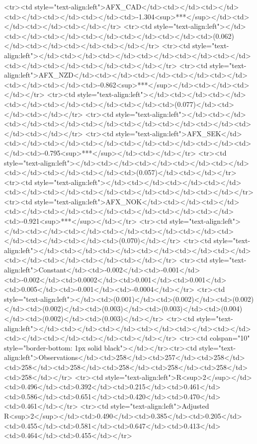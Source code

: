 <tr><td style="text-align:left">AFX_CAD</td><td></td><td></td><td></td><td></td><td></td><td>-1.304<sup>***</sup></td><td></td><td></td><td></td></tr>
<tr><td style="text-align:left"></td><td></td><td></td><td></td><td></td><td></td><td>(0.062)</td><td></td><td></td><td></td></tr>
<tr><td style="text-align:left"></td><td></td><td></td><td></td><td></td><td></td><td></td><td></td><td></td><td></td></tr>
<tr><td style="text-align:left">AFX_NZD</td><td></td><td></td><td></td><td></td><td></td><td></td><td>-0.862<sup>***</sup></td><td></td><td></td></tr>
<tr><td style="text-align:left"></td><td></td><td></td><td></td><td></td><td></td><td></td><td>(0.077)</td><td></td><td></td></tr>
<tr><td style="text-align:left"></td><td></td><td></td><td></td><td></td><td></td><td></td><td></td><td></td><td></td></tr>
<tr><td style="text-align:left">AFX_SEK</td><td></td><td></td><td></td><td></td><td></td><td></td><td></td><td>-0.795<sup>***</sup></td><td></td></tr>
<tr><td style="text-align:left"></td><td></td><td></td><td></td><td></td><td></td><td></td><td></td><td>(0.057)</td><td></td></tr>
<tr><td style="text-align:left"></td><td></td><td></td><td></td><td></td><td></td><td></td><td></td><td></td><td></td></tr>
<tr><td style="text-align:left">AFX_NOK</td><td></td><td></td><td></td><td></td><td></td><td></td><td></td><td></td><td>-0.921<sup>***</sup></td></tr>
<tr><td style="text-align:left"></td><td></td><td></td><td></td><td></td><td></td><td></td><td></td><td></td><td>(0.070)</td></tr>
<tr><td style="text-align:left"></td><td></td><td></td><td></td><td></td><td></td><td></td><td></td><td></td><td></td></tr>
<tr><td style="text-align:left">Constant</td><td>-0.002</td><td>-0.001</td><td>-0.002</td><td>0.0002</td><td>0.001</td><td>0.001</td><td>0.005</td><td>-0.001</td><td>-0.0004</td></tr>
<tr><td style="text-align:left"></td><td>(0.001)</td><td>(0.002)</td><td>(0.002)</td><td>(0.002)</td><td>(0.003)</td><td>(0.003)</td><td>(0.004)</td><td>(0.002)</td><td>(0.003)</td></tr>
<tr><td style="text-align:left"></td><td></td><td></td><td></td><td></td><td></td><td></td><td></td><td></td><td></td></tr>
<tr><td colspan="10" style="border-bottom: 1px solid black"></td></tr><tr><td style="text-align:left">Observations</td><td>258</td><td>257</td><td>258</td><td>258</td><td>258</td><td>258</td><td>258</td><td>258</td><td>258</td></tr>
<tr><td style="text-align:left">R<sup>2</sup></td><td>0.496</td><td>0.392</td><td>0.215</td><td>0.461</td><td>0.586</td><td>0.651</td><td>0.420</td><td>0.470</td><td>0.461</td></tr>
<tr><td style="text-align:left">Adjusted R<sup>2</sup></td><td>0.490</td><td>0.385</td><td>0.205</td><td>0.455</td><td>0.581</td><td>0.647</td><td>0.413</td><td>0.464</td><td>0.455</td></tr>
